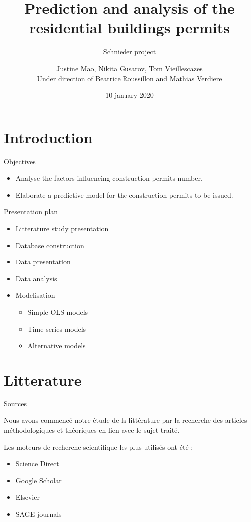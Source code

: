 \documentclass[11pt,ignorenonframetext,]{beamer}
\title{Prediction and analysis of the residential buildings permits}
\subtitle{Schnieder project}
\author{Justine Mao, Nikita Gusarov, Tom Vieillescazes\\
\tiny{Under direction of Beatrice Roussillon and Mathias Verdiere}}
\institute{Université Grenoble Alpes}
\date{10 january 2020}
\providecommand{\tightlist}{%
  \setlength{\itemsep}{0pt}\setlength{\parskip}{0pt}}
\begin{document}
\frame{\titlepage}

\hypertarget{introduction}{%
\section{Introduction}\label{introduction}}

\begin{frame}{Objectives}
\protect\hypertarget{objectives}{}

\begin{itemize}
\tightlist
\item
  Analyse the factors influencing construction permits number.
\item
  Elaborate a predictive model for the construction permits to be
  issued.
\end{itemize}

\end{frame}

\begin{frame}{Presentation plan}
\protect\hypertarget{presentation-plan}{}

\begin{itemize}
\tightlist
\item
  Litterature study presentation
\item
  Database construction
\item
  Data presentation
\item
  Data analysis
\item
  Modelisation

  \begin{itemize}
  \tightlist
  \item
    Simple OLS models
  \item
    Time series models
  \item
    Alternative models
  \end{itemize}
\end{itemize}

\end{frame}

\hypertarget{litterature}{%
\section{Litterature}\label{litterature}}

\begin{frame}{Sources}
\protect\hypertarget{sources}{}

Nous avons commencé notre étude de la littérature par la recherche des
articles méthodologiques et théoriques en lien avec le sujet traité.

Les moteurs de recherche scientifique les plus utilisés ont été :

\begin{itemize}
\tightlist
\item
  Science Direct
\item
  Google Scholar
\item
  Elsevier
\item
  SAGE journals
\end{itemize}

\end{frame}
\end{document}
